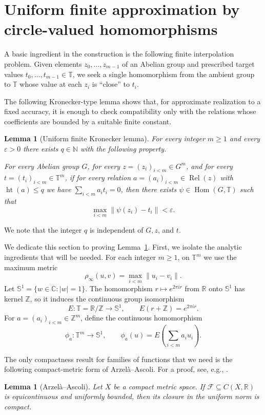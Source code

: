 \documentclass[10pt,a4paper]{amsart}
\newtheorem{lemma}[theorem]{Lemma}
\newcommand{\T}{\mathbb T}
\newcommand{\N}{\mathbb N}
\newcommand{\Z}{\mathbb Z}
\newcommand{\Hom}{\operatorname{Hom}}
\newcommand{\Rel}{\operatorname{Rel}}
\newcommand{\htop}{\operatorname{ht}}
\begin{document}
\section{Uniform finite approximation by circle-valued homomorphisms}

A basic ingredient in the construction is the
following finite interpolation problem.  Given elements
$z_0,\ldots,z_{m-1}$ of an Abelian group and prescribed target values
$t_0,\ldots,t_{m-1}\in\T$, we seek a single homomorphism from the ambient
group to $\T$ whose value at each $z_i$ is ``close'' to $t_i$.

The following Kronecker-type lemma shows
that, for approximate realization to a fixed accuracy, it is enough to check
compatibility only with the relations whose coefficients are bounded by a
suitable finite constant.

\begin{lemma}[Uniform finite Kronecker lemma]\label{lem:uniform-kronecker}
For every integer $m\geq1$ and every $\varepsilon>0$ there exists $q\in\N$
with the following property.

For every Abelian group $G$, for every
$z=(z_i)_{i<m}\in G^m$, and for every
$t=(t_i)_{i<m}\in\T^m$, if for every relation
$a=(a_i)_{i<m}\in\Rel(z)$ with $\htop(a)\leq q$ we have
$\sum_{i<m}a_i t_i=0$, then there exists $\psi\in\Hom(G,\T)$ such that
\[
 \max_{i<m}\|\psi(z_i)-t_i\|<\varepsilon.
\]
\end{lemma}
We note that the integer $q$ is independent of $G,z$, and $t$.

We dedicate this section to proving Lemma~\ref{lem:uniform-kronecker}.
First, we isolate the analytic ingredients that will be needed.  For each
integer $m\geq1$, on $\T^m$ we use the maximum metric
\[
 \rho_\infty(u,v)=\max_{i<m}\|u_i-v_i\|.
\]
Let $\mathbb S^1=\{w\in\mathbb C:|w|=1\}$.  The homomorphism
$r\mapsto e^{2\pi i r}$ from $\mathbb R$ onto $\mathbb S^1$ has kernel
$\mathbb Z$, so it induces the continuous group isomorphism
\[
 E:\T=\mathbb R/\mathbb Z\longrightarrow\mathbb S^1,
 \qquad E(r+\mathbb Z)=e^{2\pi i r}.
\]
For $a=(a_i)_{i<m}\in\Z^m$, define the continuous homomorphism
\[
 \phi_a:\T^m\longrightarrow\mathbb S^1,
 \qquad \phi_a(u)=E\left(\sum_{i<m}a_i u_i\right).
\]

The only compactness result for families of functions that we need is the
following compact-metric form of Arzel\`a--Ascoli.  For a proof, see, e.g.,
\cite[Theorem~8.2.10]{Engelking1989}.

\begin{lemma}[Arzel\`a--Ascoli]\label{lem:arzela-ascoli-uniform}
Let $X$ be a compact metric space.  If
$\mathcal F\subseteq C(X,\mathbb R)$ is equicontinuous and uniformly bounded,
then its closure in the uniform norm is compact.
\end{lemma}
\end{document}
